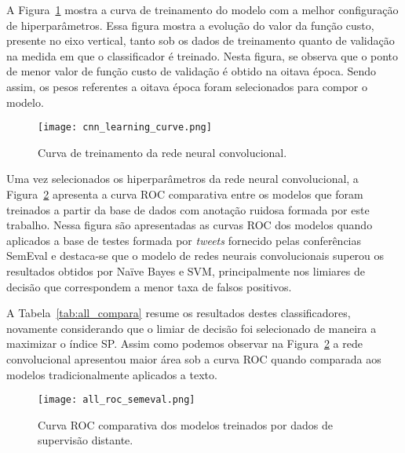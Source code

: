 A Figura~\ref{fig:cnn_learning_curve} mostra a curva de treinamento do modelo com a melhor configuração de hiperparâmetros.
Essa figura mostra a evolução do valor da função custo, presente no eixo vertical, tanto sob os dados de treinamento
quanto de validação na medida em que o classificador é treinado.
Nesta figura, se observa que o ponto de menor valor de função custo de validação é obtido na oitava época.
Sendo assim, os pesos referentes a oitava época foram selecionados para compor o modelo.

\begin{figure}
\begin{center} {
    \begin{center}
    \texttt{[image: cnn\_learning\_curve.png]}
    \caption{Curva de treinamento da rede neural convolucional.}
    \label{fig:cnn_learning_curve}
    \end{center}
}
\end{center}
\end{figure}

Uma vez selecionados os hiperparâmetros da rede neural convolucional, a Figura~\ref{fig:all_roc_semeval} apresenta a
curva ROC comparativa entre os modelos que foram treinados a partir da base de dados com anotação ruidosa formada por
este trabalho.
Nessa figura são apresentadas as curvas ROC dos modelos quando aplicados a base de testes formada por \textit{tweets}
fornecido pelas conferências SemEval e destaca-se que o modelo de redes neurais convolucionais superou os resultados
obtidos por Naïve Bayes e SVM, principalmente nos limiares de decisão que correspondem a menor taxa de falsos positivos.

A Tabela~\ref{tab:all_compara} resume os resultados destes classificadores, novamente considerando que o limiar de
decisão foi selecionado de maneira a maximizar o índice SP.
Assim como podemos observar na Figura~\ref{fig:all_roc_semeval} a rede convolucional apresentou maior área sob a curva
ROC quando comparada aos modelos tradicionalmente aplicados a texto.

\begin{figure}
\begin{center} {
    \begin{center}
    \texttt{[image: all\_roc\_semeval.png]}
    \caption{Curva ROC comparativa dos modelos treinados por dados de supervisão distante.}
    \label{fig:all_roc_semeval}
    \end{center}
}
\end{center}
\end{figure}

